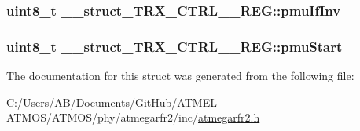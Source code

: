 \hypertarget{struct____struct___t_r_x___c_t_r_l__0___r_e_g_a72377ce08eac29c87a57c1cced0f34d1}{
\subsubsection[{pmu\-If\-Inv}]{\setlength{\rightskip}{0pt plus 5cm}uint8\-\_\-t \-\_\-\-\_\-struct\-\_\-\-T\-R\-X\-\_\-\-C\-T\-R\-L\-\_\-\_\-\-R\-E\-G\-::pmu\-If\-Inv}}\label{struct____struct___t_r_x___c_t_r_l__0___r_e_g_a72377ce08eac29c87a57c1cced0f34d1}
\hypertarget{struct____struct___t_r_x___c_t_r_l__0___r_e_g_a60912b6d06dd8d49433dd44b34c24196}{
\subsubsection[{pmu\-Start}]{\setlength{\rightskip}{0pt plus 5cm}uint8\-\_\-t \-\_\-\-\_\-struct\-\_\-\-T\-R\-X\-\_\-\-C\-T\-R\-L\-\_\-\_\-\-R\-E\-G\-::pmu\-Start}}\label{struct____struct___t_r_x___c_t_r_l__0___r_e_g_a60912b6d06dd8d49433dd44b34c24196}


The documentation for this struct was generated from the following file\-:\begin{DoxyCompactItemize}
\item 
C\-:/\-Users/\-A\-B/\-Documents/\-Git\-Hub/\-A\-T\-M\-E\-L-\/\-A\-T\-M\-O\-S/\-A\-T\-M\-O\-S/phy/atmegarfr2/inc/\hyperlink{atmegarfr2_8h}{atmegarfr2.\-h}\end{DoxyCompactItemize}
